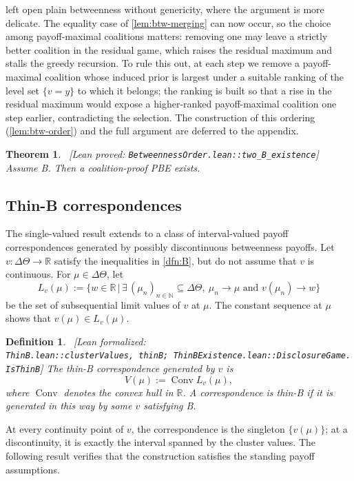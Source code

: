 \documentclass[11pt]{article}
\newtheorem{theorem}{Theorem}
\newtheorem{definition}{Definition}
\newcommand{\sep}{\,|\,}
\newcommand{\leanproved}[1]{{\footnotesize\textsf{\textcolor{green!55!black}{[Lean proved: \texttt{#1}]}}}}
\newcommand{\leanformalized}[1]{{\footnotesize\textsf{\textcolor{green!55!black}{[Lean formalized: \texttt{#1}]}}}}
\begin{document}
 left open plain betweenness without genericity, where the argument is more delicate. The equality case of \cref{lem:btw-merging} can now occur, so the choice among payoff-maximal coalitions matters: removing one may leave a strictly better coalition in the residual game, which raises the residual maximum and stalls the greedy recursion. To rule this out, at each step we remove a payoff-maximal coalition whose induced prior is largest under a suitable ranking of the level set $\{v=y\}$ to which it belongs; the ranking is built so that a rise in the residual maximum would expose a higher-ranked payoff-maximal coalition one step earlier, contradicting the selection. The construction of this ordering (\cref{lem:btw-order}) and the full argument are deferred to the appendix.

\begin{theorem}\label{thm:two-B}\ \leanproved{BetweennessOrder.lean::two\_B\_existence}
    Assume B. Then a coalition-proof PBE exists.
\end{theorem}

\subsection{Thin-B correspondences}\label{sec:existence-thinB}

The single-valued result extends to a class of interval-valued payoff correspondences generated by possibly discontinuous betweenness payoffs. Let $v:\Delta\Theta\to\mathbb{R}$ satisfy the inequalities in \cref{dfn:B}, but do not assume that $v$ is continuous. For $\mu\in\Delta\Theta$, let
\[
    L_v(\mu)
    :=
    \bigl\{
        w\in\mathbb{R}
        \sep
        \exists\,(\mu_n)_{n\in\mathbb{N}}\subseteq\Delta\Theta,\
        \mu_n\to\mu
        \text{ and }
        v(\mu_n)\to w
    \bigr\}
\]
be the set of subsequential limit values of $v$ at $\mu$. The constant sequence at $\mu$ shows that $v(\mu)\in L_v(\mu)$.

\begin{definition}\label{dfn:thinB}\ \leanformalized{ThinB.lean::clusterValues,\ thinB;\ ThinBExistence.lean::DisclosureGame.IsThinB}
    The \emph{thin-B correspondence generated by $v$} is
    \[
        V(\mu):=\operatorname{Conv}L_v(\mu),
    \]
    where $\operatorname{Conv}$ denotes the convex hull in $\mathbb{R}$. A correspondence is \emph{thin-B} if it is generated in this way by some $v$ satisfying B.
\end{definition}

At every continuity point of $v$, the correspondence is the singleton $\{v(\mu)\}$; at a discontinuity, it is exactly the interval spanned by the cluster values. The following result verifies that the construction satisfies the standing payoff assumptions.
\end{document}
